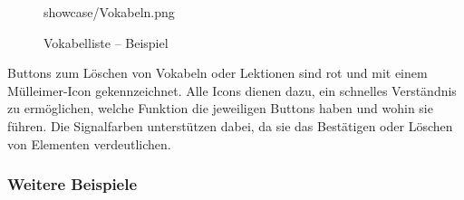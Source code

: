 \documentclass[12pt,a4paper]{article}
\begin{document}
\begin{figure}[H]
{showcase/Vokabeln.png}
    \caption{Vokabelliste – Beispiel}
    \label{fig:festes_bild}
\end{figure}

Buttons zum Löschen von Vokabeln oder Lektionen sind rot und mit einem Mülleimer-Icon gekennzeichnet. Alle Icons dienen dazu, ein schnelles Verständnis zu ermöglichen, welche Funktion die jeweiligen Buttons haben und wohin sie führen. Die Signalfarben unterstützen dabei, da sie das Bestätigen oder Löschen von Elementen verdeutlichen.

\newpage
\subsubsection{Weitere Beispiele}
\end{document}
